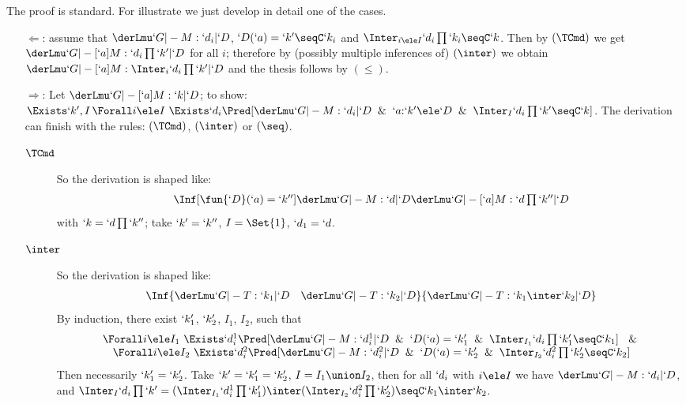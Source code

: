 \documentclass{CSML}
\begin{document}
\begin{Proof}
The proof is standard. For illustrate we just develop in detail one of the cases. 

\begin{itemize}[label=$\Leftarrow$:]
\item [$\Leftarrow$:] assume that $\derLmuInt `G |- M : `d_i | `D $,  $`D(`a) =`k' \seqC `k_i$ and $\Inter_{i \ele I} `d_i\prod `k_i \seqC `k$.
	Then by $(\TCmd)$ we get $\derLmuInt `G |- [`a]M : `d_i \prod `k' | `D $ for all $i$; therefore by (possibly multiple inferences of) $(\inter)$ we obtain
	$\derLmuInt `G |- [`a]M : \Inter_i `d_i \prod `k' | `D$ and the thesis follows by $(\leq)$.

\item [$\Rightarrow$:] 
	Let $ \derLmuInt `G |- [`a]M : `k | `D $; to show: $ \Exists `k',I \, \Forall i \ele I ~ \Exists `d_i \Pred[ \derLmuInt `G |- M : `d_i | `D \And `a{:}`k' \ele `D \And \Inter_I `d_i\prod `k' \seqC `k ]  $.
The derivation can finish with the rules: $(\TCmd)$, $(\inter)$ or $(\seq)$.

 \begin{description}
 \item[$\TCmd$] 
So the derivation is shaped like:
 \[ \begin{array}{c}
\Inf	[\fun{`D }(`a)=`k'']	
	{ \InfBox{ \derLmu `G |- M : `d | `D }
	}{ \derLmu `G |- [`a]M : `d\prod `k'' | `D }
 \end{array} \]
with $`k = `d\prod `k''$; take $`k' = `k''$, $I = \Set{1}$, $`d_1 = `d$.

 \item[$\inter$] 
So the derivation is shaped like:
 \[ \begin{array}{c}
\Inf	{\InfBox{ \derLmu `G |- T : `k_1 | `D }
	\quad
	\InfBox{ \derLmu `G |- T : `k_2 | `D }
	}{ \derLmu `G |- T : `k_1\inter`k_2 | `D }
 \end{array} \]
By induction, there exist $`k'_1$, $`k'_2$, $I_1$, $I_2$, such that
 \[ \begin{array}{c}
\Forall i \ele I_1 ~ \Exists `d^1_i \Pred[ \derLmuInt `G |- M : `d^1_i | `D \And `D(`a) = `k'_1 \And \Inter_{I_1} `d_i\prod `k'_1 \seqC `k_1 ] ~ \And
	\\
\Forall i \ele I_2 ~ \Exists `d^2_i \Pred[ \derLmuInt `G |- M : `d^2_i | `D \And `D(`a) = `k'_2 \And \Inter_{I_2} `d^2_i\prod `k'_2 \seqC `k_2 ] 
 \end{array} \]
Then necessarily $`k'_1 = `k'_2$.
Take $`k' = `k'_1 = `k'_2$, $I = I_1 \union I_2$, then for all $`d_i$ with $i \ele I$ we have $ \derLmuInt `G |- M : `d_i | `D $, and $ \Inter_I `d_i\prod `k' = ( \Inter_{I_1} `d^1_i\prod `k'_1 ) \inter ( \Inter_{I_2} `d^2_i\prod `k'_2 ) \seqC `k_1 \inter `k_2 $.


\end{description}
\end{itemize}
\end{Proof}
\end{document}
